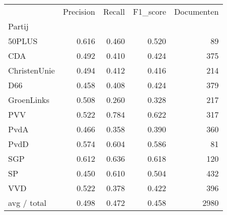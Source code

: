\begin{tabular}{lrrrr}
\toprule
{} &  Precision &  Recall &  F1\_score &  Documenten \\
Partij       &            &         &           &             \\
\midrule
50PLUS       &      0.616 &   0.460 &     0.520 &          89 \\
   CDA       &      0.492 &   0.410 &     0.424 &         375 \\
ChristenUnie &      0.494 &   0.412 &     0.416 &         214 \\
   D66       &      0.458 &   0.408 &     0.424 &         379 \\
  GroenLinks &      0.508 &   0.260 &     0.328 &         217 \\
   PVV       &      0.522 &   0.784 &     0.622 &         317 \\
  PvdA       &      0.466 &   0.358 &     0.390 &         360 \\
  PvdD       &      0.574 &   0.604 &     0.586 &          81 \\
   SGP       &      0.612 &   0.636 &     0.618 &         120 \\
    SP       &      0.450 &   0.610 &     0.504 &         432 \\
   VVD       &      0.522 &   0.378 &     0.422 &         396 \\
 avg / total &      0.498 &   0.472 &     0.458 &        2980 \\
\bottomrule
\end{tabular}
